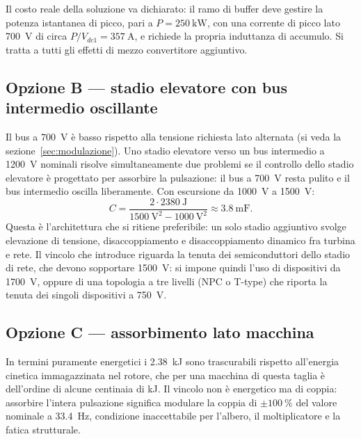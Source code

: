 \documentclass[11pt,a4paper]{article}
\begin{document}
Il costo reale della soluzione va dichiarato: il ramo di buffer deve gestire la potenza
istantanea di picco, pari a $P=\SI{250}{\kilo\watt}$, con una corrente di picco lato
\SI{700}{\volt} di circa $P/V_{dc1}=\SI{357}{\ampere}$, e richiede la propria induttanza
di accumulo. Si tratta a tutti gli effetti di mezzo convertitore aggiuntivo.

\subsection{Opzione B --- stadio elevatore con bus intermedio oscillante}

Il bus a \SI{700}{\volt} è basso rispetto alla tensione richiesta lato alternata (si veda
la sezione~\ref{sec:modulazione}). Uno stadio elevatore verso un bus intermedio a
\SI{1200}{\volt} nominali risolve simultaneamente due problemi se il controllo dello
stadio elevatore è progettato per assorbire la pulsazione: il bus a \SI{700}{\volt} resta
pulito e il bus intermedio oscilla liberamente. Con escursione da \SI{1000}{\volt} a
\SI{1500}{\volt}:
\begin{equation}
C = \frac{2\cdot\SI{2380}{\joule}}{\SI{1500}{\volt}^2-\SI{1000}{\volt}^2}
\approx \SI{3.8}{\milli\farad}.
\end{equation}
Questa è l'architettura che si ritiene preferibile: un solo stadio aggiuntivo svolge
elevazione di tensione, disaccoppiamento e disaccoppiamento dinamico fra turbina e rete.
Il vincolo che introduce riguarda la tenuta dei semiconduttori dello stadio di rete, che
devono sopportare \SI{1500}{\volt}: si impone quindi l'uso di dispositivi da
\SI{1700}{\volt}, oppure di una topologia a tre livelli (NPC o T-type) che riporta la
tenuta dei singoli dispositivi a \SI{750}{\volt}.

\subsection{Opzione C --- assorbimento lato macchina}

In termini puramente energetici i \SI{2.38}{\kilo\joule} sono trascurabili rispetto
all'energia cinetica immagazzinata nel rotore, che per una macchina di questa taglia è
dell'ordine di alcune centinaia di \si{\kilo\joule}. Il vincolo non è energetico ma di
coppia: assorbire l'intera pulsazione significa modulare la coppia di
$\pm\SI{100}{\percent}$ del valore nominale a \SI{33.4}{\hertz}, condizione inaccettabile
per l'albero, il moltiplicatore e la fatica strutturale.
\end{document}
